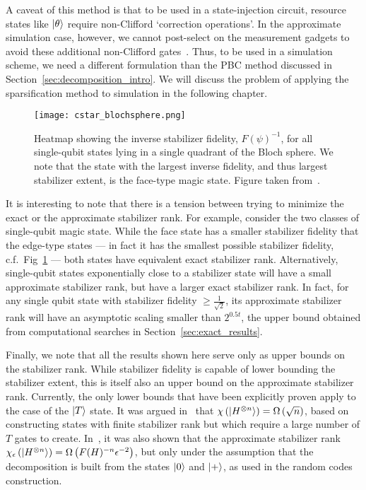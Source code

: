 A caveat of this method is that to be used in a state-injection circuit, resource states like $\ket{\theta}$ require non-Clifford `correction operations'. In the approximate simulation case, however, we cannot post-select on the measurement gadgets to avoid these additional non-Clifford gates~\cite{Bravyi2016}. Thus, to be used in a simulation scheme, we need a different formulation than the PBC method discussed in Section~\ref{sec:decomposition_intro}. We will discuss the problem of applying the sparsification method to simulation in the following chapter.\par
\begin{figure}[H]
\centering
\texttt{[image: cstar\_blochsphere.png]}
\caption{Heatmap showing the inverse stabilizer fidelity, $F(\psi)^{-1}$, for all single-qubit states lying in a single quadrant of the Bloch sphere. We note that the state with the largest inverse fidelity, and thus largest stabilizer extent, is the face-type magic state. Figure taken from~\cite{Bravyi2018}.}
\label{fig:fidelity_heatmap}
\end{figure}
It is interesting to note that there is a tension between trying to minimize the exact or the approximate stabilizer rank. For example, consider the two classes of single-qubit magic state. While the face state has a smaller stabilizer fidelity that the edge-type states ---  in fact it has the smallest possible stabilizer fidelity, c.f.\ Fig~\ref{fig:fidelity_heatmap} --- both states have equivalent exact stabilizer rank. Alternatively, single-qubit states exponentially close to a stabilizer state will have a small approximate stabilizer rank, but have a larger exact stabilizer rank. In fact, for any single qubit state with stabilizer fidelity $\geq\frac{1}{\sqrt{2}}$, its approximate stabilizer rank will have an asymptotic scaling smaller than $2^{0.5t}$, the upper bound obtained from computational searches in Section~\ref{sec:exact_results}.\par
Finally, we note that all the results shown here serve only as upper bounds on the stabilizer rank. While stabilizer fidelity is capable of lower bounding the stabilizer extent, this is itself also an upper bound on the approximate stabilizer rank. Currently, the only lower bounds that have been explicitly proven apply to the case of the $\ket{T}$ state. It was argued in~\cite{Bravyi2015} that $\chi\left(\ket{H^{\otimes n}}\right)=\Omega\left(\sqrt{n}\right)$, based on constructing states with finite stabilizer rank but which require a large number of $T$ gates to create. In~\cite{Bravyi2018}, it was also shown that the approximate stabilizer rank $\chi_{\epsilon}\left(\ket{H^{\otimes n}}\right)=\Omega\left(F(H)^{-n}\epsilon^{-2}\right)$, but only under the assumption that the decomposition is built from the states $\ket{0}$ and $\ket{+}$, as used in the random codes construction.\par
